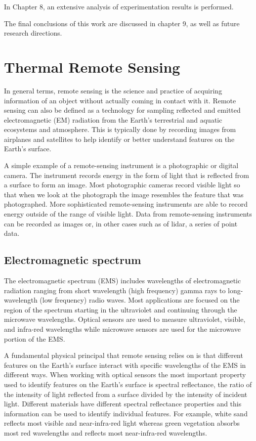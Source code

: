 In Chapter 8, an extensive analysis of experimentation results is performed.

The final conclusions of this work are discussed in chapter 9, as well as future research directions.

\newpage

    
\section{Thermal Remote Sensing} \label{sec:thermal_remote_sensing}

In general terms, remote sensing is the science and practice of acquiring information of an object without actually coming in contact with it.
Remote sensing can also be defined as a technology for sampling reflected and emitted electromagnetic (EM) radiation from the Earth’s terrestrial and aquatic ecosystems and atmosphere.
This is typically done by recording images from airplanes and satellites to help identify or better understand features on the Earth’s surface.

A simple example of a remote-sensing instrument is a photographic or digital camera.
The instrument records energy in the form of light that is reflected from a surface to form an image.
Most photographic cameras record visible light so that when we look at the photograph the image resembles the feature that was photographed.
More sophisticated remote-sensing instruments are able to record energy outside of the range of visible light.
Data from remote-sensing instruments can be recorded as images or, in other cases such as of lidar, a series of point data.

    \subsection{Electromagnetic spectrum}

    The electromagnetic spectrum (EMS) includes wavelengths of electromagnetic radiation ranging from short wavelength (high frequency) gamma rays to long-wavelength (low frequency) radio waves. 
    Most applications are focused on the region of the spectrum starting in the ultraviolet and continuing through the microwave wavelengths. 
    Optical sensors are used to measure ultraviolet, visible, and infra-red wavelengths while microwave sensors are used for the microwave portion of the EMS.
    
    A fundamental physical principal that remote sensing relies on is that different features on the Earth's surface interact with specific wavelengths of the EMS in different ways.
    When working with optical sensors the most important property used to identify features on the Earth's surface is spectral reflectance, the ratio of the intensity of light reflected from a surface divided by the intensity of incident light.
    Different materials have different spectral reflectance properties and this information can be used to identify individual features.
    For example, white sand reflects most visible and near-infra-red light whereas green vegetation absorbs most red wavelengths and reflects most near-infra-red wavelengths.    

